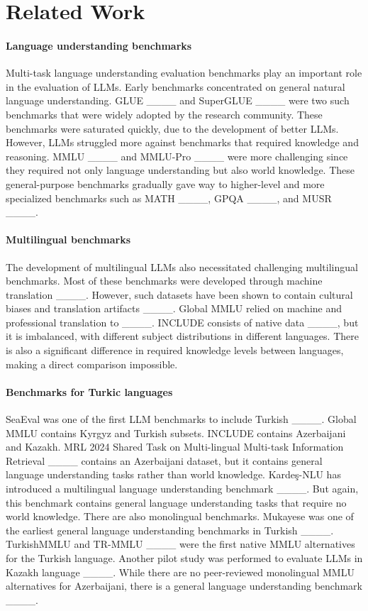 \section{Related Work}
\paragraph{Language understanding benchmarks}
Multi-task language understanding evaluation benchmarks play an important role in the evaluation of LLMs. Early benchmarks concentrated on general natural language understanding. GLUE ____ and SuperGLUE ____ were two such benchmarks that were widely adopted by the research community. These benchmarks were saturated quickly, due to the development of better LLMs. However, LLMs struggled more against benchmarks that required knowledge and reasoning. MMLU ____ and MMLU-Pro ____ were more challenging since they required not only language understanding but also world knowledge. These general-purpose benchmarks gradually gave way to higher-level and more specialized benchmarks such as MATH ____, GPQA ____, and MUSR ____.

\paragraph{Multilingual benchmarks}
The development of multilingual LLMs also necessitated challenging multilingual benchmarks. Most of these benchmarks were developed through machine translation ____. However, such datasets have been shown to contain cultural biases and translation artifacts ____. Global MMLU relied on machine and professional translation to ____. INCLUDE consists of native data ____, but it is imbalanced, with different subject distributions in different languages. There is also a significant difference in required knowledge levels between languages, making a direct comparison impossible.

\paragraph{Benchmarks for Turkic languages}
SeaEval was one of the first LLM benchmarks to include Turkish ____. Global MMLU contains Kyrgyz and Turkish subsets. INCLUDE contains Azerbaijani and Kazakh. MRL 2024 Shared Task on Multi-lingual Multi-task Information Retrieval ____ contains an Azerbaijani dataset, but it contains general language understanding tasks rather than world knowledge. Kardeş-NLU has introduced a multilingual language understanding benchmark ____. But again, this benchmark contains general language understanding tasks that require no world knowledge. There are also monolingual benchmarks. Mukayese was one of the earliest general language understanding benchmarks in Turkish ____. TurkishMMLU and TR-MMLU ____ were the first native MMLU alternatives for the Turkish language. Another pilot study was performed to evaluate LLMs in Kazakh language ____. While there are no peer-reviewed monolingual MMLU alternatives for Azerbaijani, there is a general language understanding benchmark ____.

